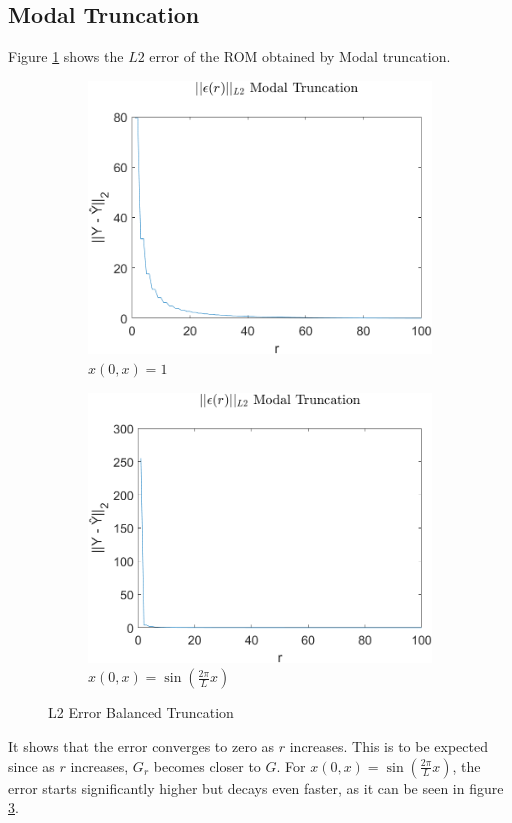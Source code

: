 \subsection{Modal Truncation}
Figure \ref{FIG-ERR-MT} shows the \(L2\) error of the ROM obtained by Modal truncation.
\begin{figure}[H]
\begin{subfigure}[b]{0.5\textwidth}
\centering
\includegraphics[width=\textwidth]{images/L2_MT}
\caption{$x(0, x) = 1$}
\label{FIG-ERR-MT}
\end{subfigure}
\begin{subfigure}[b]{0.5\textwidth}
\centering
\includegraphics[width=\textwidth]{images/L2_MT_SIN}
\caption{$x(0, x) = \sin(\frac{2\pi}{L}x)$}
\label{FIG-ERR-MT-SIN}
\end{subfigure}
\caption{L2 Error Balanced Truncation}
\end{figure}
It shows that the error converges to zero as \(r\) increases.
This is to be expected since as \(r\) increases, \(G_r\) becomes closer to \(G\).
For \(x(0, x) = \sin(\frac{2\pi}{L}x)\), the error starts significantly higher but decays even faster, as it can be seen in figure \ref{FIG-ERR-MT-SIN}.
\newpage
